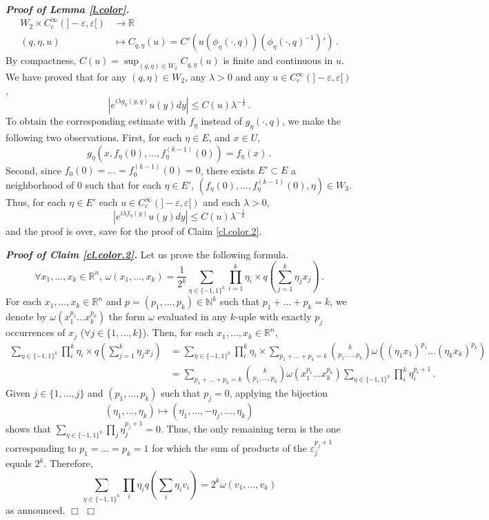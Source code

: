 \documentclass[10pt,twoside]{article}
\newcommand{\eps}{\varepsilon}
\newcommand{\R}{\mathbb{R}}
\newcommand{\N}{\mathbb{N}}
\newenvironment{prf}[1][]
{\vskip 2mm  {\it \bf Proof#1. }}{$\Box$ \vskip 2mm}
\numberwithin{theorem}{section}
\begin{document}
\begin{prf}[ of Lemma \ref{l.color}]
\begin{align*}
W_2\times C^\infty_c\left(]-\eps,\eps[\right)&\rightarrow\R\\
(q,\eta,u)&\mapsto C_{q,\eta}(u)=C'\left(u(\phi_\eta(\cdot,q))\left(\phi_\eta(\cdot,q)^{-1}\right)'\right)\, .
\end{align*}
By compactness, $C(u)=\sup_{(q,\eta)\in W_2}C_{q,\eta}(u)$ is finite and continuous in $u$. We have proved that for any $(q,\eta)\in W_2$, any $\lambda>0$ and any $u\in C^\infty_c(]-\eps,\eps[)$,
\[
\left|e^{i\lambda g_\eta(y,q)}u(y)dy\right|\leq C(u)\lambda^{-\frac{1}{k}}\, .
\]
To obtain the corresponding estimate with $f_\eta$ instead of $g_\eta(\cdot,q)$, we make the following two observations. First, for each $\eta\in E$, and $x\in U$,
\[
g_\eta(x,f_\eta(0),\dots,f_\eta^{(k-1)}(0))=f_\eta(x)\, .
\]
Second, since $f_0(0)=\dots=f^{(k-1)}_0(0)=0$, there exists $E'\subset E$ a neighborhood of $0$ such that for each $\eta\in E'$, $(f_\eta(0),\dots,f_\eta^{(k-1)}(0),\eta)\in W_3$. Thus, for each $\eta\in E'$  each $u\in C^\infty_c(]-\eps,\eps[)$ and each $\lambda>0$,
\[
\left|e^{i\lambda f_\eta(y)}u(y)dy\right|\leq C(u)\lambda^{-\frac{1}{k}}
\]
and the proof is over, save for the proof of Claim \ref{cl.color.2}.

\begin{prf}[ of Claim \ref{cl.color.2}]
Let us prove the following formula.
\[
\forall x_1,\dots,x_k\in\R^n,\, \omega(x_1,\dots,x_k)=\frac{1}{2^k}\sum_{\eta\in\{-1,1\}^k}\prod_{i=1}^k\eta_i\times q\left( \sum_{j=1}^k\eta_jx_j\right)\, .
\]
For each $x_1,\dots,x_k\in\R^n$ and $p=(p_1,\dots,p_k)\in\N^k$ such that $p_1+\dots+p_k=k$, we denote by $\omega\left(x_1^{p_1}\dots x_k^{p_k}\right)$ the form $\omega$ evaluated in any $k$-uple with exactly $p_j$ occurrences of $x_j$ ($\forall j\in\{1,\dots,k\}$). Then, for each $x_1,\dots,x_k\in\R^n$,
\begin{align*}
\sum_{\eta\in\{-1,1\}^k}\prod_i^k\eta_i\times q\left(\sum_{j=1}^k\eta_jx_j\right)&=\sum_{\eta\in\{-1,1\}^k}\prod_i^k\eta_i\times\sum_{p_1+\dots+p_k=k}\binom{k}{p_1,\dots,p_k}\omega\left((\eta_1x_1)^{p_1}\dots (\eta_kx_k)^{p_k}\right)\\
&=\sum_{p_1+\dots+p_k=k}\binom{k}{p_1,\dots,p_k}\omega\left(x_1^{p_1}\dots x_k^{p_k}\right)\sum_{\eta\in\{-1,1\}^k}\prod_i^k\eta_i^{p_i+1}\, .
\end{align*}
Given $j\in\{1,\dots,j\}$ and $(p_1,\dots,p_k)$ such that $p_j=0$, applying the bijection
\[
(\eta_1,\dots,\eta_k)\mapsto (\eta_1,\dots,-\eta_j,\dots,\eta_k)
\]
shows that $\sum_{\eta\in\{-1,1\}^k}\prod_j\eta_j^{p_j+1}=0$. Thus, the only remaining term is the one corresponding to $p_1=\dots=p_k=1$ for which the sum of products of the $\eps_j^{p_j+1}$ equals $2^k$. Therefore,
\[
\sum_{\eta\in\{-1,1\}^k}\prod_i\eta_iq\left(\sum_i\eta_iv_i\right)=2^k\omega(v_1,\dots,v_k)
\]
as announced.
\end{prf}
\end{prf}
\end{document}
